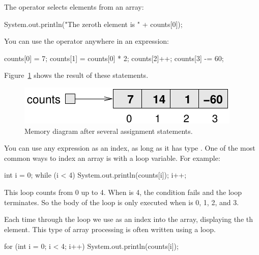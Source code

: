 The \java{[]} operator selects elements from an array:

\begin{code}
System.out.println("The zeroth element is " + counts[0]);
\end{code}

You can use the \java{[]} operator anywhere in an expression:

\begin{code}
counts[0] = 7;
counts[1] = counts[0] * 2;
counts[2]++;
counts[3] -= 60;
\end{code}

Figure~\ref{fig.array2} shows the result of these statements.

\begin{figure}[!ht]
\begin{center}
\includegraphics{figs/array2.pdf}
\caption{Memory diagram after several assignment statements.}
\label{fig.array2}
\end{center}
\end{figure}

You can use any expression as an index, as long as it has type .
One of the most common ways to index an array is with a loop variable.
For example:

\begin{code}
int i = 0;
while (i < 4) {
    System.out.println(counts[i]);
    i++;
}
\end{code}

This  loop counts from 0 up to 4.
When  is 4, the condition fails and the loop terminates.
So the body of the loop is only executed when  is 0, 1, 2, and 3.


Each time through the loop we use  as an index into the array, displaying the th element.
This type of array processing is often written using a  loop.

\begin{code}
for (int i = 0; i < 4; i++) {
    System.out.println(counts[i]);
}
\end{code}


